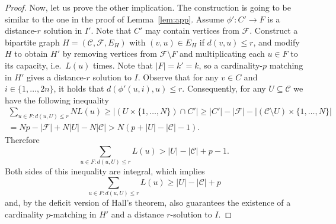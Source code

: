 \documentclass{article}
\newcommand{\F}{\mathcal{F}}
\newcommand{\C}{\mathcal{C}}
\newcommand{\sub}{\subseteq}
\newcommand{\sm}{\setminus}
\theoremstyle{plain}
\theoremstyle{definition}
\begin{document}
\begin{proof}
Now, let us prove the other implication. The construction is going
to be similar to the one in the proof of Lemma~\ref{lem:app}.
Assume $\phi':C'\to F$ is a distance-$r$
solution in $I'$. Note that $C'$ may contain vertices from $\F$.
Construct a bipartite graph $H=(\C, \F, E_H)$ with $(v,u)\in E_H$ if $d(v,u)\le r$,
and modify $H$ to obtain $H'$ by removing vertices from $\F\sm F$ and multiplicating each $u\in F$
to its capacity, i.e.\ $L(u)$ times.
Note that $|F|=k'=k$, so  a cardinality-$p$ matching in $H'$ gives a distance-$r$ solution to $I$.
Observe that for any $v\in C$ and $i\in\{1,\ldots,2n\}$, it holds that $d(\phi'(u,i),u)\le r$.
Consequently, for any $U\sub \C$
 we have the following inequality
\begin{multline*}
\sum_{u\in F: d(u,U)\le r} NL(u) \ge \left|\left(U\times\{1,\ldots,N\}\right)\cap C'\right|\ge |C'|-|\F|-\left|(\C\sm U)\times\{1,\ldots,N\}\right|\\
= Np - |\F|+N|U| - N|\C|> N(p+|U|-|\C|-1).
\end{multline*}
Therefore
$$\sum_{u\in F : d(u,U)\le r} L(u) > |U|-|\C|+p-1.$$
Both sides of this inequality are integral, which implies 
$$
\sum_{u\in F : d(u,U)\le r} L(u) \ge|U|-|\C|+p
$$
and, by the deficit version of Hall's theorem, also guarantees the existence of a cardinality $p$-matching in $H'$ and a distance $r$-solution to $I$.
\end{proof}
\end{document}
